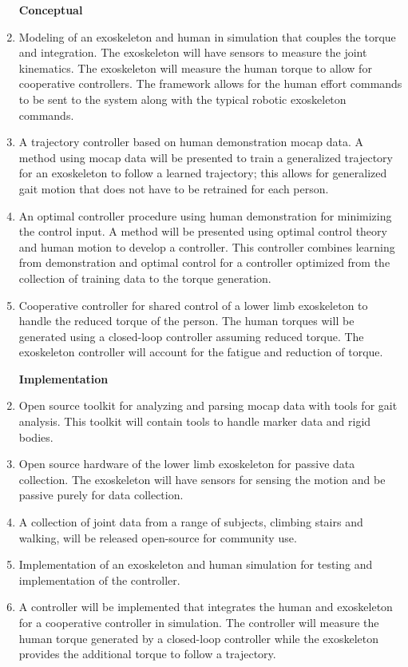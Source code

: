 \begin{enumerate}[wide, nosep, labelindent = 0pt, topsep = 1ex]
\item[\textbf{\textbf{Conceptual}}]
    \item  Modeling of an exoskeleton and human in simulation that couples the torque and integration. The exoskeleton will have sensors to measure the joint kinematics. The exoskeleton will measure the human torque to allow for cooperative controllers. The framework allows for the human effort commands to be sent to the system along with the typical robotic exoskeleton commands. 
    \item A trajectory controller based on human demonstration mocap data. A method using mocap data will be presented to train a generalized trajectory for an exoskeleton to follow a learned trajectory; this allows for generalized gait motion that does not have to be retrained for each person. 
    \item An optimal controller procedure using human demonstration for minimizing the control input. A method will be presented using optimal control theory and human motion to develop a controller. This controller combines learning from demonstration and optimal control for a controller optimized from the collection of training data to the torque generation. 
    \item Cooperative controller for shared control of a lower limb exoskeleton to handle the reduced torque of the person. The human torques will be generated using a closed-loop controller assuming reduced torque. The exoskeleton controller will account for the fatigue and reduction of torque. 
\end{enumerate}


\begin{enumerate}[wide, nosep, labelindent = 0pt, topsep = 1ex]
\item[\textbf{\textbf{Implementation}}]
    \item Open source toolkit for analyzing and parsing mocap data with tools for gait analysis. This toolkit will contain tools to handle marker data and rigid bodies.  
    \item Open source hardware of the lower limb exoskeleton for passive data collection. The exoskeleton will have sensors for sensing the motion and be passive purely for data collection.
    \item A collection of joint data from a range of subjects, climbing stairs and walking, will be released open-source for community use.  
    \item Implementation of an exoskeleton and human simulation for testing and implementation of the controller.
    \item A controller will be implemented that integrates the human and exoskeleton for a cooperative controller in simulation. The controller will measure the human torque generated by a closed-loop controller while the exoskeleton provides the additional torque to follow a trajectory.  
\end{enumerate}